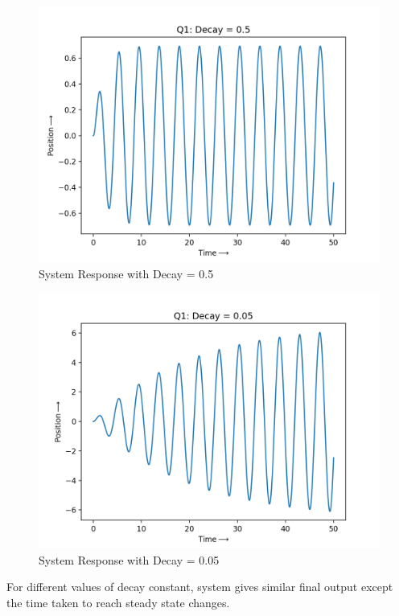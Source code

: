 \documentclass[11pt, a4paper]{article}
\begin{document}
\begin{figure}[tbh!]
\centering
\includegraphics[scale=0.6]{Q1_1.png}
\caption{System Response with Decay = 0.5}
\label{fig:System Response with Decay = 0.5}
\end{figure}
\newpage

\begin{figure}[tbh!]
\centering
\includegraphics[scale=0.6]{Q1_2.png}
\caption{System Response with Decay = 0.05}
\label{fig:System Response with Decay = 0.05}
\end{figure}

For different values of decay constant, system gives similar final output except the time taken to reach steady state changes.
\end{document}

